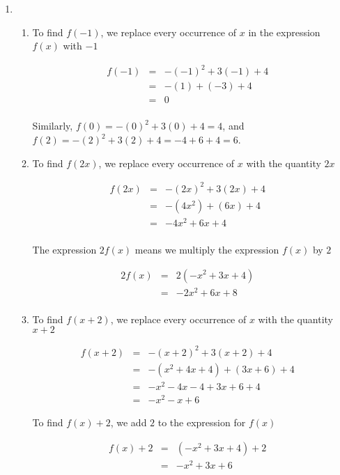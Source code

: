{
\begin{enumerate}

\item \begin{enumerate} \item  To find $f(-1)$, we replace every occurrence of $x$ in the expression $f(x)$ with $-1$

\[ \begin{array}{rclr}  
f(-1) & = & -(-1)^2 + 3(-1) + 4 & \\
      & = & -(1) + (-3) + 4 & \\ 
      & = & 0 & \\ 
      \end{array} \]


Similarly, $f(0) = -(0)^2 + 3(0) + 4 = 4$, and $f(2) = -(2)^2 + 3(2) + 4 = -4+6+4 = 6$.

\item To find $f(2x)$, we replace every occurrence of $x$ with the quantity $2x$

\[ \begin{array}{rclr}  
f(2x) & = & -(2x)^2 + 3(2x) + 4 & \\
      & = & -(4x^2) + (6x) + 4 & \\
      & = & -4x^2+6x+4 & \\ 
      \end{array} \]

The expression $2f(x)$ means we multiply the expression $f(x)$ by $2$

\[ \begin{array}{rclr}  
2f(x) & = & 2\left(-x^2 + 3x + 4\right) & \\
      & = & -2x^2 + 6x + 8 \\ 
      \end{array} \]


\item  To find $f(x+2)$, we replace every occurrence of $x$ with the quantity $x+2$

\[ \begin{array}{rclr}  
f(x+2) & = & -(x+2)^2 + 3(x+2) + 4 & \\
       & = & -\left(x^2 + 4x + 4\right) + (3x+6) + 4 & \\
       & = & -x^2-4x-4+3x+6+4 &  \\
       & = & -x^2-x+6 & 
       \end{array} \]

 To find $f(x)+2$, we add $2$ to the expression for $f(x)$
 
\[ \begin{array}{rclr}  
f(x) + 2 & = & \left(-x^2 + 3x + 4\right) + 2  & \\
         & = & -x^2 + 3x + 6 \\ 
         \end{array} \]


\end{enumerate}
\end{enumerate}}
